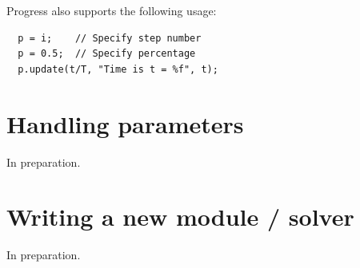 \documentclass[12pt]{article}
\begin{document}
Progress also supports the following usage:

\begin{verbatim}
  p = i;    // Specify step number
  p = 0.5;  // Specify percentage
  p.update(t/T, "Time is t = %f", t);
\end{verbatim}

\cleardoublepage
\section{Handling parameters}

In preparation.

\cleardoublepage
\section{Writing a new module / solver}

In preparation.
\end{document}
